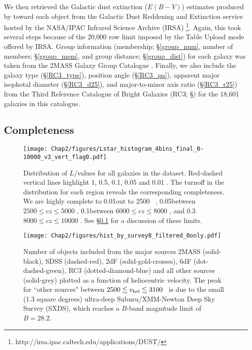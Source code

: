 We then retrieved the Galactic dust extinction ($E(B-V)$) estimates produced by \cite{schlafly2011} toward each object from the Galactic Dust Reddening and Extinction service hosted by the NASA/IPAC Infrared Science Archive (IRSA) \footnote{http://irsa.ipac.caltech.edu/applications/DUST/}. Again, this took several steps because of the 20,000 row limit imposed by the Table Upload mode offered by IRSA. Group information (membership; \S \ref{group_num}, number of members; \S \ref{group_mem}, and group distance; \S \ref{group_dist}) for each galaxy was taken from the 2MASS Galaxy Group Catalogue \cite{tully2015}. Finally, we also include the galaxy type (\S \ref{RC3_type}), position angle (\S \ref{RC3_pa}), apparent major isophotal diameter (\S \ref{RC3_d25}), and major-to-minor axis ratio (\S \ref{RC3_r25}) from the Third Reference Catalogue of Bright Galaxies (RC3; \S \citealt{RC3}) for the 18,601 galaxies in this catalogue.

\subsection{Completeness} \label{completeness}

\begin{figure}[ht!]
        \centering
        \vspace{0pt}
        \texttt{[image: Chap2/figures/Lstar\_histogram\_4bins\_final\_0-10000\_v3\_vert\_flag0.pdf]}
        \caption{\small{Distribution of $L/$\Lstar values  for all galaxies in the dataset. Red-dashed vertical lines highlight 1, 0.5, 0.1, 0.05 and 0.01 \Lstar. The turnoff in the distribution for each region reveals the corresponding completeness. We are highly complete to 0.01\Lstar out to 2500 \kms~, 0.05\Lstar between $2500 \leq cz \leq 5000$ \kms, 0.1\Lstar between $6000 \leq cz \leq 8000$ \kms, and 0.3\Lstar $8000 \leq cz \leq 10000$ \kms. See \S \ref{completeness} for a discussion of these limits.}}
        \vspace{5pt}
        \label{completeness_plot}
\end{figure} 

\begin{figure}[ht!]
        \centering
        \vspace{0pt}
        \texttt{[image: Chap2/figures/hist\_by\_survey8\_filtered\_0only.pdf]}
        \caption{\small{Number of objects included from the major sources 2MASS (solid-black), SDSS (dashed-red), 2dF (solid-gold-crosses), 6dF (dot-dashed-green), RC3 (dotted-diamond-blue) and all other sources (solid-grey) plotted as a function of heliocentric velocity. The peak for ``other sources" between $2500 \lesssim v_{\rm hel} \lesssim 3100$ \kms~is due to the small (1.3 square degrees) ultra-deep Suburu/XMM-Newton Deep Sky Survey (SXDS), which reaches a $B$-band magnitude limit of $B=28.2$.}}
        \vspace{5pt}
        \label{source_histograms}
\end{figure} 


